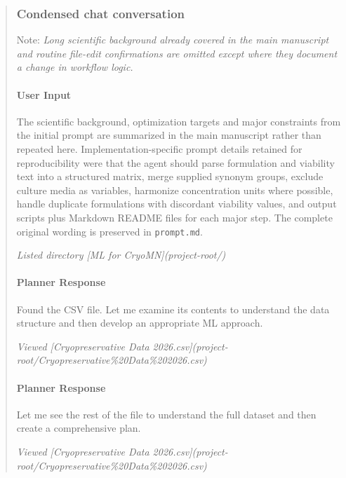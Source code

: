\documentclass[preprint,12pt]{elsarticle}
\newenvironment{promptbar}{\begin{quote}\scriptsize\raggedright\sloppy}{\end{quote}}
\begin{document}
\begingroup
\small
\setlength{\parskip}{0.45em}
\begin{promptbar}
\subsubsection*{Condensed chat conversation}

Note: \textit{Long scientific background already covered in the main manuscript and routine file-edit confirmations are omitted except where they document a change in workflow logic.}

\paragraph*{User Input}

The scientific background, optimization targets and major constraints from the initial prompt are summarized in the main manuscript rather than repeated here. Implementation-specific prompt details retained for reproducibility were that the agent should parse formulation and viability text into a structured matrix, merge supplied synonym groups, exclude culture media as variables, harmonize concentration units where possible, handle duplicate formulations with discordant viability values, and output scripts plus Markdown README files for each major step. The complete original wording is preserved in \texttt{prompt.md}.

\textit{Listed directory [ML for CryoMN](project-root/)}

\paragraph*{Planner Response}

Found the CSV file. Let me examine its contents to understand the data structure and then develop an appropriate ML approach.

\textit{Viewed [Cryopreservative Data 2026.csv](project-root/Cryopreservative\%20Data\%202026.csv)}

\paragraph*{Planner Response}

Let me see the rest of the file to understand the full dataset and then create a comprehensive plan.

\textit{Viewed [Cryopreservative Data 2026.csv](project-root/Cryopreservative\%20Data\%202026.csv)}


\end{promptbar}
\end{document}
